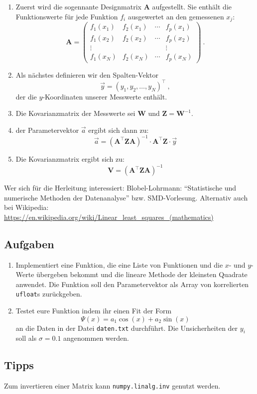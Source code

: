 \documentclass{scrartcl}
\begin{document}
\begin{enumerate}
  \item Zuerst wird die sogennante Designmatrix $\symbf{A}$ aufgestellt.
    Sie enthält die Funktionswerte für jede Funktion $f_i$ ausgewertet an den gemessenen $x_j$:
    \begin{equation}
      \symbf{A} =
      \begin{pmatrix}
        f_1(x_1) & f_2(x_1) & \cdots & f_p(x_1) \\
        f_1(x_2) & f_2(x_2) & \cdots & f_p(x_2) \\
        \vdots   &          &        &  \vdots  \\
        f_1(x_N) & f_2(x_N) & \cdots & f_p(x_N)
      \end{pmatrix} \ .
    \end{equation}
  \item Als nächstes definieren wir den Spalten-Vektor
    \begin{equation}
      \vec{y} = (y_1, y_2, …, y_N)^{\top} \ ,
    \end{equation}
    der die $y$-Koordinaten unserer Messwerte enthält.
  \item Die Kovarianzmatrix der Messwerte sei $\symbf{W}$ und $\symbf{Z} = \symbf{W}^{-1}$.
  \item der Parametervektor $\vec{a}$ ergibt sich dann zu:
    \begin{equation}
      \vec{a} = \left(\symbf{A}^\top \symbf{Z} \symbf{A}\right)^{-1} \cdot \symbf{A}^\top \symbf{Z} \cdot \vec{y}
    \end{equation}
  \item Die Kovarianzmatrix ergibt sich zu:
    \begin{equation}
      \symbf{V} = \left(\symbf{A}^\top \symbf{Z} \symbf{A}\right)^{-1}
    \end{equation}
\end{enumerate}
Wer sich für die Herleitung interessiert: Blobel-Lohrmann: \enquote{Statistische und numerische Methoden der Datenanalyse} bzw. SMD-Vorlesung.
Alternativ auch bei Wikipedia: \url{https://en.wikipedia.org/wiki/Linear_least_squares_(mathematics)}

\subsection*{Aufgaben}

\begin{enumerate}
  \item Implementiert eine Funktion, die eine Liste von Funktionen und die $x$- und $y$-Werte übergeben bekommt und die lineare Methode der kleinsten Quadrate anwendet.
    Die Funktion soll den Parametervektor als Array von korrelierten \texttt{ufloat}s zurückgeben.
  \item Testet eure Funktion indem ihr einen Fit der Form
    \begin{equation}
      \Psi(x) = a_1 \cos(x) + a_2 \sin(x)
    \end{equation}
    an die Daten in der Datei \texttt{daten.txt} durchführt.
    Die Unsicherheiten der $y_i$ soll als $\sigma = \num{0.1}$ angenommen werden.
\end{enumerate}

\subsection*{Tipps}

Zum invertieren einer Matrix kann \texttt{numpy.linalg.inv} genutzt werden.
\end{document}
